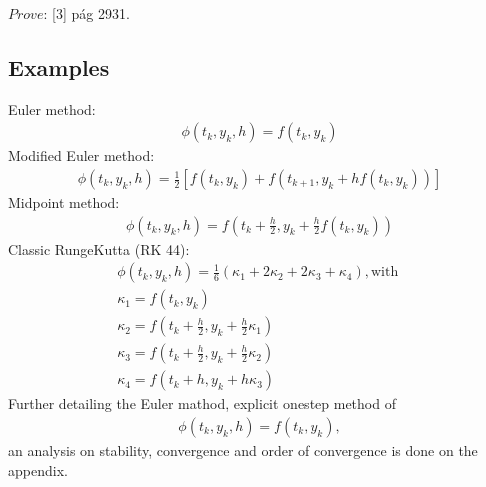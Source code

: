 \documentclass[letterpaper,10pt,english]{jupyterBook}
\begin{document}
\sphinxAtStartPar
\(\textit{Prove:}\) {[}3{]} pág 29\sphinxhyphen{}31.


\subsection{Examples}
\label{\detokenize{cap2:examples}}
\sphinxAtStartPar
Euler method:
\begin{equation*}
\begin{split}
    \phi (t_{k},y_{k},h) = f(t_{k},y_{k})
\end{split}
\end{equation*}
\sphinxAtStartPar
Modified Euler method:
\begin{equation*}
\begin{split}
    \phi (t_{k},y_{k},h) = \frac{1}{2} \left[ f(t_{k},y_{k}) + f(t_{k+1},y_{k} + h f(t_{k},y_{k})) \right]
\end{split}
\end{equation*}
\sphinxAtStartPar
Midpoint method:
\begin{equation*}
\begin{split}
    \phi (t_{k},y_{k},h) = f(t_{k} + \frac{h}{2},y_{k} + \frac{h}{2} f(t_{k},y_{k}))
\end{split}
\end{equation*}
\sphinxAtStartPar
Classic Runge\sphinxhyphen{}Kutta (RK 4\sphinxhyphen{}4):
\begin{equation*}
\begin{split}
    \phi (t_{k},y_{k},h) = \frac{1}{6} \left( \kappa_1 + 2 \kappa_2 + 2 \kappa_3 + \kappa_4 \right), \text{with }\\
    \kappa_1 = f(t_{k},y_{k})\\
    \kappa_2 = f(t_{k} + \frac{h}{2},y_{k} + \frac{h}{2} \kappa_1)\\
    \kappa_3 = f(t_{k} + \frac{h}{2},y_{k} + \frac{h}{2} \kappa_2)\\
    \kappa_4 = f(t_{k} + h, y_{k} + h \kappa_3)
\end{split}
\end{equation*}
\sphinxAtStartPar
Further detailing the Euler mathod, explicit one\sphinxhyphen{}step method of
\begin{equation*}
\begin{split}
    \phi (t_{k},y_{k},h) = f(t_{k},y_{k}),
\end{split}
\end{equation*}
\sphinxAtStartPar
an analysis on stability, convergence and order of convergence is done on the appendix.
\end{document}
